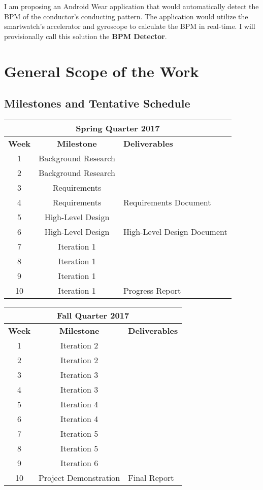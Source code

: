 \documentclass[12pt]{article}
\begin{document}
I am proposing an Android Wear application that would automatically detect the BPM of the conductor's conducting pattern. The application would utilize the smartwatch's accelerator and gyroscope to calculate the BPM in real-time. I will provisionally call this solution the \textbf{BPM Detector}.

\section{General Scope of the Work}

\subsection{Milestones and Tentative Schedule}
\begin{center}
  \begin{tabular}{ |c|c|p{4in}| } 
  \hline 
  \multicolumn{3}{|c|}{\textbf{Spring Quarter 2017}} \\
  \hline
  \textbf{Week} & \textbf{Milestone} & \textbf{Deliverables} \\ 
  \hline
  1 & Background Research & \\
  \hline 
  2 & Background Research & \\
  \hline 
  3 & Requirements & \\
  \hline
  4 & Requirements & Requirements Document \\
  \hline
  5 & High-Level Design & \\
  \hline 
  6 & High-Level Design & High-Level Design Document\\
  \hline 
  7 & Iteration 1 & \\
  \hline 
  8 & Iteration 1 & \\
  \hline 
  9 & Iteration 1 & \\
  \hline 
  10 & Iteration 1 & Progress Report\\
  \hline
  \end{tabular}

  \begin{tabular}{ |c|c|p{4in}| } 
  \hline 
  \multicolumn{3}{|c|}{\textbf{Fall Quarter 2017}} \\
  \hline
  \textbf{Week} & \textbf{Milestone} & \textbf{Deliverables} \\
  \hline
  1 & Iteration 2 & \\
  \hline 
  2 & Iteration 2 & \\
  \hline 
  3 & Iteration 3 & \\
  \hline
  4 & Iteration 3 & \\ 
  \hline 
  5 & Iteration 4 & \\
  \hline 
  6 &  Iteration 4 & \\
  \hline 
  7 & Iteration 5 & \\
  \hline 
  8 & Iteration 5 & \\
  \hline 
  9 & Iteration 6 & \\
  \hline 
  10 & Project Demonstration & Final Report\\ 
  \hline
  \end{tabular}
\newline
\end{center}
\end{document}
